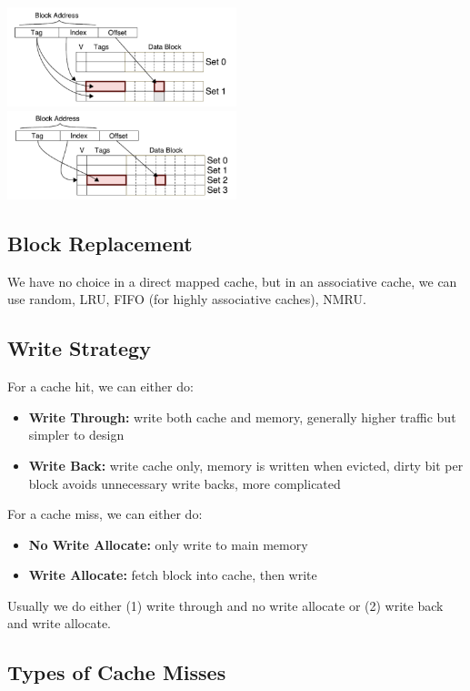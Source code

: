 \documentclass{article}
\begin{document}
\includegraphics[width=0.5\textwidth]{2way-8-4line.png}
\includegraphics[width=0.5\textwidth]{direct-8-4line.png}

\subsection{Block Replacement}

We have no choice in a direct mapped cache, but in an associative cache, we can use random, LRU, FIFO (for highly associative caches), NMRU.

\subsection{Write Strategy}

For a cache hit, we can either do:
\begin{itemize}
\item \textbf{Write Through:} write both cache and memory, generally higher traffic but simpler to design
\item \textbf{Write Back:} write cache only, memory is written when evicted, dirty bit per block avoids unnecessary write backs, more complicated
\end{itemize}
For a cache miss, we can either do:
\begin{itemize}
\item \textbf{No Write Allocate:} only write to main memory
\item \textbf{Write Allocate:} fetch block into cache, then write
\end{itemize}
Usually we do either (1) write through and no write allocate or (2) write back and write allocate.

\subsection{Types of Cache Misses}
\end{document}

